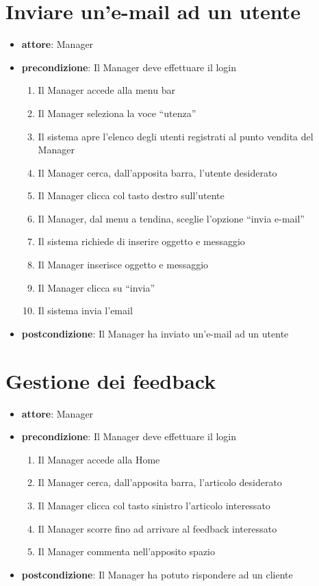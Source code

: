\section{Inviare un’e-mail ad un utente}
\begin{itemize}
    \item \textbf{attore}: Manager
    \item \textbf{precondizione}: Il Manager deve effettuare il login
    
    \begin{enumerate}
        \item Il Manager accede alla menu bar
        \item Il Manager seleziona la voce “utenza”
        \item Il sistema apre l’elenco degli utenti registrati al punto vendita del Manager
        \item Il Manager cerca, dall’apposita barra, l’utente desiderato
        \item Il Manager clicca col tasto destro sull’utente
        \item Il Manager, dal menu a tendina, sceglie l’opzione “invia e-mail”
        \item Il sistema richiede di inserire oggetto e messaggio
        \item Il Manager inserisce oggetto e messaggio
        \item Il Manager clicca su “invia”
        \item Il sistema invia l’email
    \end{enumerate}

    \item \textbf{postcondizione}: Il Manager ha inviato un’e-mail ad un utente
\end{itemize}


\section{Gestione dei feedback}
\begin{itemize}
    \item \textbf{attore}: Manager
    \item \textbf{precondizione}: Il Manager deve effettuare il login 
    
    \begin{enumerate}
        \item Il Manager accede alla Home
        \item Il Manager cerca, dall’apposita barra, l’articolo desiderato
        \item Il Manager clicca col tasto sinistro l’articolo interessato
        \item Il Manager scorre fino ad arrivare al feedback interessato
        \item Il Manager commenta nell’apposito spazio
    \end{enumerate}

    \item \textbf{postcondizione}: Il Manager ha potuto rispondere ad un cliente
\end{itemize}
